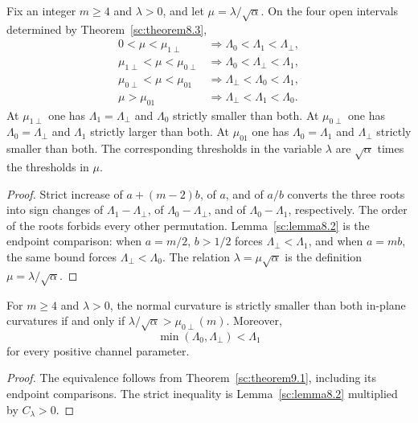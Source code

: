 \begin{theorem}[ordering]\label{sc:theorem9.1}
Fix an integer \(m\ge 4\) and \(\lambda>0\), and let \(\mu=\lambda/\sqrt\alpha\). On the four open intervals determined by Theorem~\ref{sc:theorem8.3},
\begin{align*}
0<\mu<\mu_{1\perp}&\Longrightarrow \Lambda_0<\Lambda_1<\Lambda_\perp,\\
\mu_{1\perp}<\mu<\mu_{0\perp}&\Longrightarrow \Lambda_0<\Lambda_\perp<\Lambda_1,\\
\mu_{0\perp}<\mu<\mu_{01}&\Longrightarrow \Lambda_\perp<\Lambda_0<\Lambda_1,\\
\mu>\mu_{01}&\Longrightarrow \Lambda_\perp<\Lambda_1<\Lambda_0.
\end{align*}
At \(\mu_{1\perp}\) one has \(\Lambda_1=\Lambda_\perp\) and \(\Lambda_0\) strictly smaller than both. At \(\mu_{0\perp}\) one has \(\Lambda_0=\Lambda_\perp\) and \(\Lambda_1\) strictly larger than both. At \(\mu_{01}\) one has \(\Lambda_0=\Lambda_1\) and \(\Lambda_\perp\) strictly smaller than both. The corresponding thresholds in the variable \(\lambda\) are \(\sqrt\alpha\) times the thresholds in \(\mu\).

\end{theorem}
\begin{proof}
Strict increase of \(a+(m-2)b\), of \(a\), and of \(a/b\) converts the three roots into sign changes of \(\Lambda_1-\Lambda_\perp\), of \(\Lambda_0-\Lambda_\perp\), and of \(\Lambda_0-\Lambda_1\), respectively. The order of the roots forbids every other permutation. Lemma~\ref{sc:lemma8.2} is the endpoint comparison: when \(a=m/2\), \(b>1/2\) forces \(\Lambda_\perp<\Lambda_1\), and when \(a=mb\), the same bound forces \(\Lambda_\perp<\Lambda_0\). The relation \(\lambda=\mu\sqrt\alpha\) is the definition \(\mu=\lambda/\sqrt\alpha\).

\end{proof}

\begin{corollary}\label{sc:normal-region}
For \(m\ge4\) and \(\lambda>0\), the normal curvature is strictly smaller than both in-plane curvatures if and only if
\(\lambda/\sqrt\alpha>\mu_{0\perp}(m)\).
Moreover,
\[
 \min(\Lambda_0,\Lambda_\perp)<\Lambda_1
\]
for every positive channel parameter.
\end{corollary}
\begin{proof}
The equivalence follows from Theorem~\ref{sc:theorem9.1}, including its endpoint comparisons. The strict inequality is Lemma~\ref{sc:lemma8.2} multiplied by \(C_\lambda>0\).
\end{proof}


